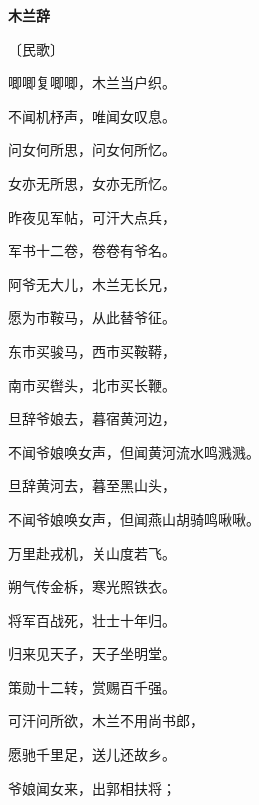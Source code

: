 \documentclass[12pt,UTF-8,openany,fontset=none]{ctexbook}
\begin{document}

\begin{center}
    {\bfseries 木兰辞}

    \vspace{18pt}

    \begin{large}\xuwen
        〔民歌〕
    \end{large}

\end{center}

    \vspace{18pt}  %

\begin{center}
    \begin{Large}

        唧唧复唧唧，木兰当户织。

        不闻机杼声，唯闻女叹息。

        问女何所思，问女何所忆。

        女亦无所思，女亦无所忆。

        昨夜见军帖，可汗大点兵，

        军书十二卷，卷卷有爷名。

        阿爷无大儿，木兰无长兄，

        愿为市鞍马，从此替爷征。

        东市买骏马，西市买鞍鞯，

        南市买辔头，北市买长鞭。

        旦辞爷娘去，暮宿黄河边，

        \hspace{36pt}不闻爷娘唤女声，但闻黄河流水鸣溅溅。

        旦辞黄河去，暮至黑山头，

        \hspace{36pt}不闻爷娘唤女声，但闻燕山胡骑鸣啾啾。

        万里赴戎机，关山度若飞。

        朔气传金柝，寒光照铁衣。

        将军百战死，壮士十年归。

        归来见天子，天子坐明堂。

        策勋十二转，赏赐百千强。

        \hspace{36pt}可汗问所欲，木兰不用尚书郎，

        愿驰千里足，送儿还故乡。

        爷娘闻女来，出郭相扶将；


\end{Large}
\end{center}
\end{document}
